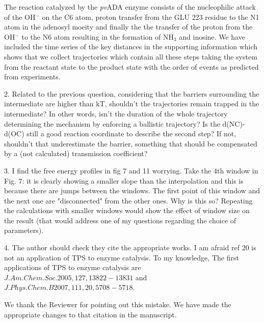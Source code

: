 \documentclass[journal=jpcbfk,manuscript=article,layout=traditional]{achemso}
\begin{document}
{\begin{response}
The reaction catalyzed by the \textit{pv}ADA enzyme consists of 
the nucleophilic attack of the OH$^{-}$ on the C6 atom, proton transfer from the 
GLU 223 residue to the N1 atom in the adenosyl moeity and finally the 
the transfer of the proton from the OH$^{-}$ to the N6 atom resulting in the formation 
of NH$_3$ and inosine. We have included the time series of the key distances in 
the supporting information which shows that we collect trajectories which contain all these
steps taking the system from the reactant state to the product state with the order of events
as predicted from experiments. 
\end{response}

\begin{response}{2. Related to the previous question, considering that the barriers 
surrounding the intermediate are higher than kT, shouldn't the trajectories remain 
trapped in the intermediate? In other words, isn't the duration of the whole trajectory 
determining the mechanism by enforcing a ballistic trajectory? Is the d(NC)-d(OC) still 
a good reaction coordinate to describe the second step? If not, shouldn't that underestimate 
the barrier, something that should be compensated by a (not calculated) transmission coefficient?}


\end{response}

\begin{response}
{3. I find the free energy profiles in fig 7 and 11 worrying. Take the 4th window in 
Fig. 7: it is clearly showing a smaller slope than the interpolation and this is because 
there are jumps between the windows. The first point of this window and the next one are 
"disconnected" from the other ones. Why is this so? Repeating the calculations with smaller 
windows would show the effect of window size on the result (that would address one of my 
questions regarding the choice of parameters).}
\end{response}

\begin{response}
{4. The author should check they cite the appropriate works. I am afraid 
ref 20 is not an application of TPS to enzyme catalysis. To my knowledge, The first 
applications of TPS to enzyme catalysis are  $J. Am. Chem. Soc.2005, 127, 13822-13831$ 
and $J. Phys. Chem. B 2007, 111, 20, 5708-5718$.}

We thank the Reviewer for pointing out this mistake. We have made the appropriate changes to that
citation in the manuscript. 
\end{response}


}
\end{document}
